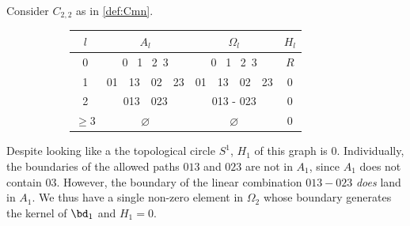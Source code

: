 \begin{example}\label{ex:commuting_square} 
Consider $C_{2,2}$ as in \cref{def:Cmn}.

    \begin{figure}[H]
        \centering
        \begin{subfigure}[c]{0.3\textwidth}
        \end{subfigure}
        \begin{subfigure}[c]{0.6\textwidth}
        \centering
        \begin{tabular}{||c||  c | c | c ||} 
         \hline
         $l$ &  $A_l$ & $\Omega_l$ & $H_l$ \\ [.5ex] 
         \hline\hline
        0 &  0 \, 1 \, 2 \,3 & 0 \, 1 \, 2 \,3 & $R$ \\ 
         \hline
          1 & 01\,\,\,\, 13\,\,\,\, 02 \,\,\,\,23 & 01\,\,\,\, 13\,\,\,\, 02 \,\,\,\,23 & 0\\ 
         \hline
          2 & 013\,\,\,\, 023 & 013 - 023 & 0\\ 
         \hline
          $\geq 3$ & $\varnothing$ & $\varnothing$ & 0 \\
         \hline
        \end{tabular}
        \end{subfigure}
    \end{figure}  
Despite looking like a the topological circle $S^1$, $H_1$ of this graph is $0$.
Individually, the boundaries of the allowed paths $013$ and $023$ are not in $A_1$, since $A_1$ does not contain $03$.
However, the boundary of the linear combination $013 - 023$ \emph{does} land in $A_1$.
We thus have a single non-zero element in $\Omega_2$ whose boundary generates the kernel of $\bd_1$ and $H_1 = 0$. 
\end{example}


